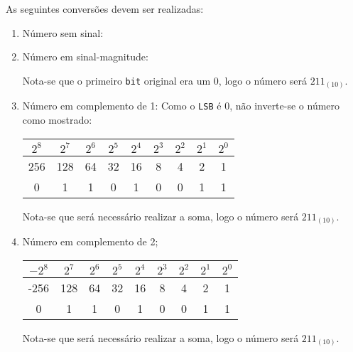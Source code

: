 \documentclass{article}
\begin{document}
\newpage
            \begin{resolution}
                As seguintes conversões devem ser realizadas:
                \begin{enumerate}
                    \item Número sem sinal:
                        \begin{figure}[H]
                            \centering
                        \end{figure}

                    \item Número em sinal-magnitude:
                        \begin{figure}[H]
                            \centering
                        \end{figure}
                    Nota-se que o primeiro \texttt{bit} original era um 0, logo o número será $\boxed{211_{(10)}}$.

                    \item Número em complemento de 1: Como o \texttt{LSB} é 0, não inverte-se o número como mostrado:
                        \begin{table}[H]
                            \centering  
                            \begin{tabular}[]{c cc cc cc cc}
                                $2^8$ & $2^7$ & $2^6$ & $2^5$ & $2^4$ & $2^3$ & $2^2$ & $2^1$ & $2^0$\\\hline
                                  256 & 128   & 64    & 32    & 16    & 8     & 4     & 2     & 1\\
                                    0 &   1   &  1    &  0    &  1    & 0     & 0     & 1     & 1\\
                            \end{tabular}
                        \end{table}
                    Nota-se que será necessário realizar a soma, logo o número será $\boxed{211_{(10)}}$.

                    \item Número em complemento de 2;
                        \begin{table}[H]
                            \centering  
                            \begin{tabular}[]{c cc cc cc cc}
                                $-2^8$ & $2^7$ & $2^6$ & $2^5$ & $2^4$ & $2^3$ & $2^2$ & $2^1$ & $2^0$\\\hline
                                  -256 & 128   & 64    & 32    & 16    & 8     & 4     & 2     & 1\\
                                     0 &   1   &  1    &  0    &  1    & 0     & 0     & 1     & 1\\
                            \end{tabular}
                        \end{table}
                    Nota-se que será necessário realizar a soma, logo o número será $\boxed{211_{(10)}}$.
                \end{enumerate}
            \end{resolution}
\end{document}
